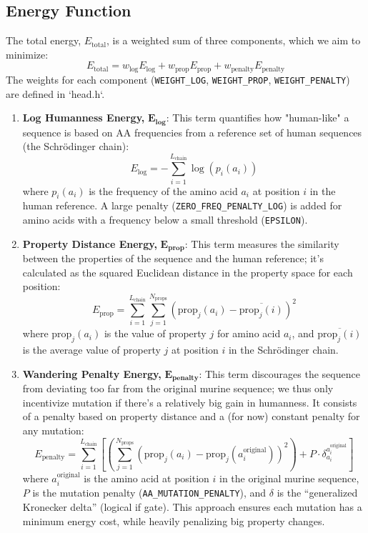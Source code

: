 \subsection{Energy Function}
The total energy, $E_\text{total}$, is a weighted sum of three components, which we aim to minimize:
    $$E_\text{total} = w_\text{log} E_\text{log} + w_\text{prop} E_\text{prop} + w_\text{penalty} E_\text{penalty}$$
    The weights for each component (\texttt{WEIGHT\_LOG}, \texttt{WEIGHT\_PROP}, \texttt{WEIGHT\_PENALTY}) are defined in `head.h`.
    \begin{enumerate}
        \item \textbf{Log Humanness Energy, }$\mathbf{E_\text{log}}$:
        This term quantifies how "human-like" a sequence is based on AA frequencies from a 
        reference set of human sequences (the Schrödinger chain):
        $$E_\text{log} = -\sum_{i=1}^{L_\text{chain}} \log(p_i(a_i))$$
        where $p_i(a_i)$ is the frequency of the amino acid $a_i$ at position $i$ in the human reference. 
        A large penalty (\texttt{ZERO\_FREQ\_PENALTY\_LOG}) is added for amino acids with a frequency below a 
        small threshold (\texttt{EPSILON}).
        \item \textbf{Property Distance Energy, }$\mathbf{E_\text{prop}}$:
        This term measures the similarity between the properties of the sequence and the human reference; 
        it's calculated as the squared Euclidean distance in the property space for each position:
        $$E_\text{prop} = \sum_{i=1}^{L_\text{chain}} \sum_{j=1}^{N_\text{props}} \left( \text{prop}_j(a_i) - 
        \overline{\text{prop}_j(i)} \right)^2$$
        where $\text{prop}_j(a_i)$ is the value of property $j$ for amino acid $a_i$, and $\overline{\text{prop}_j(i)}$ 
        is the average value of property $j$ at position $i$ in the Schrödinger chain.
        \item \textbf{Wandering Penalty Energy, }$\mathbf{E_\text{penalty}}$:
        This term discourages the sequence from deviating too far from the original murine sequence; 
        we thus only incentivize mutation if there's a relatively big gain in humanness. 
        It consists of a penalty based on property distance and a (for now) constant penalty for any mutation:
        $$E_\text{penalty} = \sum_{i=1}^{L_\text{chain}} \left[ \left( \sum_{j=1}^{N_\text{props}} 
        (\text{prop}_j(a_i) - \text{prop}_j(a_i^\text{original}))^2 \right) + P \cdot 
        \delta_{\displaystyle  a_i}^{\displaystyle a_i^{\text{original}}}\right]$$
        where $a_i^\text{original}$ is the amino acid at position $i$ in the original murine sequence, 
        $P$ is the mutation penalty (\texttt{AA\_MUTATION\_PENALTY}), and $\delta$ is the ``generalized Kronecker delta'' (logical if gate). 
        This approach ensures each mutation has a minimum energy cost, while heavily penalizing big property changes.
    \end{enumerate}

